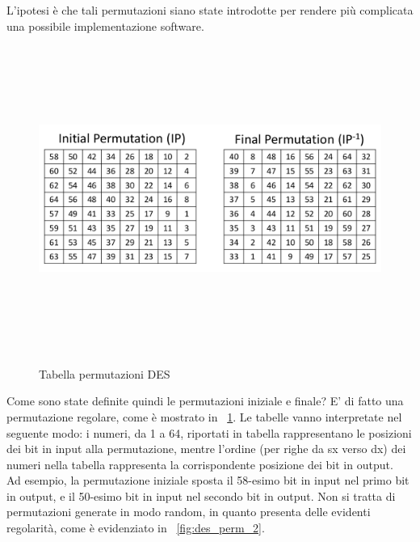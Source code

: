 L'ipotesi è che tali permutazioni siano state introdotte per rendere più complicata una possibile implementazione software.
\begin{figure}[htbp]
	\centering%
	\subfigure%
	{\includegraphics[height=10cm, width=13cm, keepaspectratio]{Immagini/chiave_segreta/des_perm.png}}
	\caption{Tabella permutazioni DES \label{fig:des_perm}} 	
\end{figure}
Come sono state definite quindi le permutazioni iniziale e finale? E' di fatto una permutazione regolare, come è mostrato in \figurename ~\ref{fig:des_perm}. Le tabelle vanno interpretate nel seguente modo: i numeri, da 1 a 64, riportati in tabella rappresentano le posizioni dei bit in input alla permutazione, mentre l’ordine (per righe da sx verso dx) dei numeri nella tabella rappresenta la corrispondente posizione dei bit in output. \\

Ad esempio, la permutazione iniziale sposta il 58-esimo bit in input nel primo bit in output, e il 50-esimo bit in input nel secondo bit in output. Non si tratta di permutazioni generate in modo random, in quanto presenta delle evidenti regolarità, come è evidenziato in \figurename ~\ref{fig:des_perm_2}.

